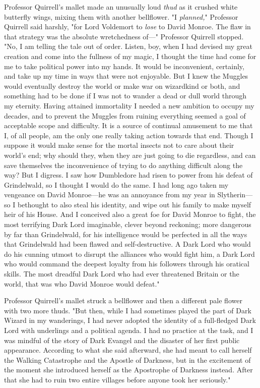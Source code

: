 Professor Quirrell's mallet made an unusually loud \emph{thud} as it crushed
white butterfly wings, mixing them with another bellflower. "I \emph{planned,}"
Professor Quirrell said harshly, "for Lord Voldemort to \emph{lose} to David
Monroe. The flaw in that strategy was the absolute wretchedness of---"
Professor Quirrell stopped. "No, I am telling the tale out of order. Listen,
boy, when I had devised my great creation and come into the fullness of my
magic, I thought the time had come for me to take political power into my
hands. It would be inconvenient, certainly, and take up my time in ways that
were not enjoyable. But I knew the Muggles would eventually destroy the world
or make war on wizardkind or both, and something had to be done if I was not to
wander a dead or dull world through my eternity. Having attained immortality I
needed a new ambition to occupy my decades, and to prevent the Muggles from
ruining everything seemed a goal of acceptable scope and difficulty. It is a
source of continual amusement to me that I, of all people, am the only one
really taking action towards that end. Though I suppose it would make sense for
the mortal insects not to care about their world's end; why should they, when
they are just going to die regardless, and can save themselves the
inconvenience of trying to do anything difficult along the way? But I digress.
I saw how Dumbledore had risen to power from his defeat of Grindelwald, so I
thought I would do the same. I had long ago taken my vengeance on David
Monroe---he was an annoyance from my year in Slytherin---so I bethought to also
steal his identity, and wipe out his family to make myself heir of his House.
And I conceived also a great foe for David Monroe to fight, the most terrifying
Dark Lord imaginable, clever beyond reckoning; more dangerous by far than
Grindelwald, for his intelligence would be perfected in all the ways that
Grindelwald had been flawed and self-destructive. A Dark Lord who would do his
cunning utmost to disrupt the alliances who would fight him, a Dark Lord who
would command the deepest loyalty from his followers through his oratical
skills. The most dreadful Dark Lord who had ever threatened Britain or the
world, that was who David Monroe would defeat."

Professor Quirrell's mallet struck a bellflower and then a different pale
flower with two more thuds. "But then, while I had sometimes played the part of
Dark Wizard in my wanderings, I had never adopted the identity of a
full-fledged Dark Lord with underlings and a political agenda. I had no
practice at the task, and I was mindful of the story of Dark Evangel and the
disaster of her first public appearance. According to what she said afterward,
she had meant to call herself the Walking Catastrophe and the Apostle of
Darkness, but in the excitement of the moment she introduced herself as the
Apostrophe of Darkness instead. After that she had to ruin two entire villages
before anyone took her seriously."

